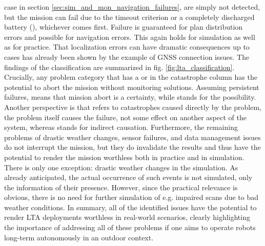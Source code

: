 \documentclass[english, master, utf8]{base/thesis_KBS}
\newcommand{\cmark}{\ding{51}}%
\newcommand{\code}{\collectverb{\codebox}}
\begin{document}
case in section \ref{sec:sim_and_mon_navigation_failures}, are simply not detected, but the mission can fail due to the timeout criterion or a completely discharged battery
(\code{CATASTROPHE}), whichever comes first. Failure is guaranteed for plan distribution errors and possible for navigation errors. This again holds for simulation as well as for
practice. That localization errors can have dramatic consequences up to \code{CATASTROPHE}
cases has already been shown by the example of GNSS connection issues. The findings of the classification are summarized in fig. \ref{fig:lta_classification}. Crucially, any problem
category that has a \textquote{\cmark} or \textquote{(\cmark)} in the catastrophe column has the potential to abort the mission without monitoring solutions. Assuming persistent
failures, \textquote{\cmark} means that mission abort is a certainty, while \textquote{(\cmark)} stands for the possibility. Another perspective is that \textquote{\cmark} refers to
catastrophes caused directly by the problem, the problem itself causes the failure, not some effect on another aspect of the system, whereas \textquote{(\cmark)} stands for indirect
causation. Furthermore, the remaining problems of drastic weather changes, sensor failures, and data management issues do not interrupt the mission, but they do invalidate the results
and thus have the potential to render the mission worthless both in practice and in simulation. There is only one exception: drastic weather changes in the simulation. As already
anticipated, the actual occurrence of such events is not simulated, only the information of their presence. However, since the practical relevance is obvious, there is no need for
further simulation of e.g. impaired scans due to bad weather conditions. In summary, all of the identified issues have the potential to render LTA deployments worthless in real-world
scenarios, clearly highlighting the importance of addressing all of these problems if one aims to operate robots long-term autonomously in an outdoor context.
\end{document}
